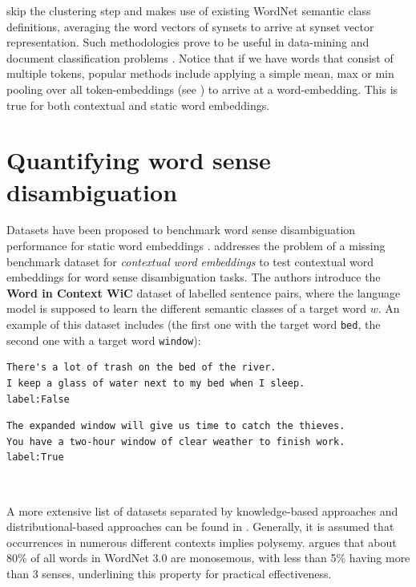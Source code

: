 \documentclass[a4paper,12pt,oneside,openright]{report}
\begin{document}
\cite{remus18} skip the clustering step and makes use of existing WordNet semantic class definitions, averaging the word vectors of synsets to arrive at synset vector representation.
Such methodologies prove to be useful in data-mining and document classification problems \cite{reimers19}.
Notice that if we have words that consist of multiple tokens, popular methods include applying a simple mean, max or min pooling over all token-embeddings (see \cite{bommasani19, akbik19, may19}) to arrive at a word-embedding. 
This is true for both contextual and static word embeddings. \\

\section{Quantifying word sense disambiguation}

Datasets have been proposed to benchmark word sense disambiguation performance for static word embeddings \cite{bruni13, hill15}.
\cite{pilehvar19} addresses the problem of a missing benchmark dataset for \textit{contextual word embeddings} to test contextual word embeddings for word sense disambiguation tasks.
The authors introduce the \textbf{Word in Context WiC} dataset of labelled sentence pairs, where the language model is supposed to learn the different semantic classes of a target word $w$. 
An example of this dataset includes (the first one with the target word \Verb#bed#, the second one with a target word \Verb#window#): \\

\begin{tcolorbox}
\begin{verbatim}
There's a lot of trash on the bed of the river.
I keep a glass of water next to my bed when I sleep.
label:False
\end{verbatim}
\end{tcolorbox}

\quad

\begin{tcolorbox}
\begin{verbatim}
The expanded window will give us time to catch the thieves.
You have a two-hour window of clear weather to finish work.
label:True
\end{verbatim} \\
\end{tcolorbox} 

A more extensive list of datasets separated by knowledge-based approaches and distributional-based approaches can be found in \cite{camachocollados18, liebeskind19, navigli19}.
Generally, it is assumed that occurrences in numerous different contexts implies polysemy.
\cite{camachocollados18} argues that about 80\% of all words in WordNet  3.0 are monosemous, with less than 5\% having more than 3 senses, underlining this property for practical effectiveness. \\
\end{document}

